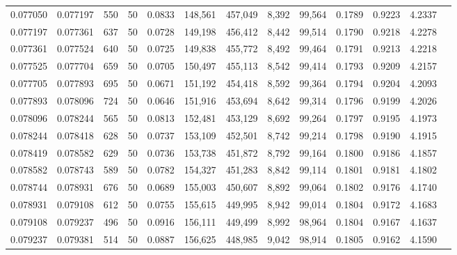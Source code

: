 \begin{tabular}{rrrrrrrrrrrrr}
0.077050 & 0.077197 &   550 &  50 &                                     0.0833 & 148,561 & 457,049 &   8,392 &  99,564 & 0.1789 & 0.9223 & 4.2337 \\
0.077197 & 0.077361 &   637 &  50 &                                     0.0728 & 149,198 & 456,412 &   8,442 &  99,514 & 0.1790 & 0.9218 & 4.2278 \\
0.077361 & 0.077524 &   640 &  50 &                                     0.0725 & 149,838 & 455,772 &   8,492 &  99,464 & 0.1791 & 0.9213 & 4.2218 \\
0.077525 & 0.077704 &   659 &  50 &                                     0.0705 & 150,497 & 455,113 &   8,542 &  99,414 & 0.1793 & 0.9209 & 4.2157 \\
0.077705 & 0.077893 &   695 &  50 &                                     0.0671 & 151,192 & 454,418 &   8,592 &  99,364 & 0.1794 & 0.9204 & 4.2093 \\
0.077893 & 0.078096 &   724 &  50 &                                     0.0646 & 151,916 & 453,694 &   8,642 &  99,314 & 0.1796 & 0.9199 & 4.2026 \\
0.078096 & 0.078244 &   565 &  50 &                                     0.0813 & 152,481 & 453,129 &   8,692 &  99,264 & 0.1797 & 0.9195 & 4.1973 \\
0.078244 & 0.078418 &   628 &  50 &                                     0.0737 & 153,109 & 452,501 &   8,742 &  99,214 & 0.1798 & 0.9190 & 4.1915 \\
0.078419 & 0.078582 &   629 &  50 &                                     0.0736 & 153,738 & 451,872 &   8,792 &  99,164 & 0.1800 & 0.9186 & 4.1857 \\
0.078582 & 0.078743 &   589 &  50 &                                     0.0782 & 154,327 & 451,283 &   8,842 &  99,114 & 0.1801 & 0.9181 & 4.1802 \\
0.078744 & 0.078931 &   676 &  50 &                                     0.0689 & 155,003 & 450,607 &   8,892 &  99,064 & 0.1802 & 0.9176 & 4.1740 \\
0.078931 & 0.079108 &   612 &  50 &                                     0.0755 & 155,615 & 449,995 &   8,942 &  99,014 & 0.1804 & 0.9172 & 4.1683 \\
0.079108 & 0.079237 &   496 &  50 &                                     0.0916 & 156,111 & 449,499 &   8,992 &  98,964 & 0.1804 & 0.9167 & 4.1637 \\
0.079237 & 0.079381 &   514 &  50 &                                     0.0887 & 156,625 & 448,985 &   9,042 &  98,914 & 0.1805 & 0.9162 & 4.1590 \\

\end{tabular}
